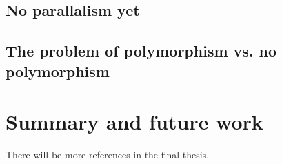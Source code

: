 \documentclass[11pt]{article}
\begin{document}
\subsection{No parallalism yet}

\subsection{The problem of polymorphism vs. no polymorphism}

\section{Summary and future work}




{}


There will be more references in the final thesis. 
\end{document}
